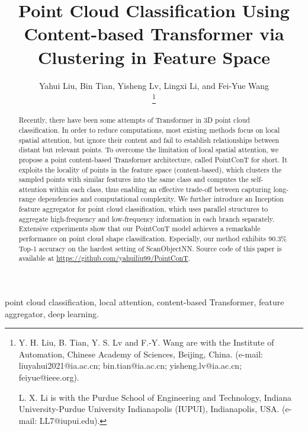 \documentclass[lettersize,journal]{IEEEtran}
\begin{document}
\title{Point Cloud Classification Using Content-based Transformer via Clustering in Feature Space}

\author{
Yahui Liu, Bin Tian, Yisheng Lv, Lingxi Li, and Fei-Yue Wang

\thanks{Y. H. Liu, B. Tian, Y. S. Lv and F.-Y. Wang are with the Institute of Automation,
  Chinese Academy of Sciences, Beijing, China. (e-mail: liuyahui2021@ia.ac.cn; bin.tian@ia.ac.cn;
  yisheng.lv@ia.ac.cn; feiyue@ieee.org).
  
  L. X. Li is with the Purdue School of Engineering and Technology, Indiana University-Purdue University Indianapolis (IUPUI), Indianapolis, USA.
  (e-mail: LL7@iupui.edu).}
}



\maketitle

\begin{abstract}
  Recently, there have been some attempts of Transformer in 3D point cloud classification.  
  In order to reduce computations, most existing methods focus on local spatial attention, but ignore their content and fail to establish relationships between distant but relevant points. 
  To overcome the limitation of local spatial attention, we propose a point content-based Transformer architecture, called PointConT for short.
  It exploits the locality of points in the feature space (content-based), which clusters the sampled points with similar features into the same class and computes
  the self-attention within each class, thus enabling an effective trade-off between capturing long-range dependencies and computational complexity. 
  We further introduce an Inception feature aggregator for point cloud classification, which uses parallel structures to aggregate high-frequency and low-frequency information in each branch separately.
  Extensive experiments show that our PointConT model achieves a remarkable performance on point cloud shape classification.  Especially, our method exhibits
  90.3\% Top-1 accuracy on the hardest setting of ScanObjectNN. 
  Source code of this paper is available at \url{https://github.com/yahuiliu99/PointConT}.
\end{abstract}

\begin{IEEEkeywords}
point cloud classification, local attention, content-based Transformer, feature aggregator, deep learning.
\end{IEEEkeywords}
\end{document}
